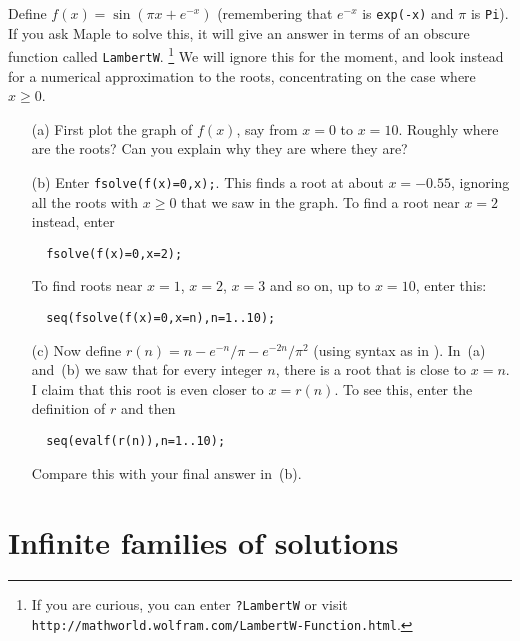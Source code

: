 \documentclass[a4paper,10pt]{amsbook}
\numberwithin{example}{chapter}
\begin{document}
\begin{exercise}\label{ex-adjusted-sin}
 Define $f(x)=\sin(\pi x+e^{-x})$ (remembering that $e^{-x}$ is
 \verb~exp(-x)~ and $\pi$ is \verb~Pi~).  If you ask Maple to solve
 this, it will give an answer in terms of an obscure function called
 \verb~LambertW~.  \footnote{If you are curious, you can enter
   \verb~?LambertW~ or visit
   \verb~http://mathworld.wolfram.com/LambertW-Function.html~.} 
 We will ignore this for the moment, and look instead for a numerical
 approximation to the roots, concentrating on the case where
 $x\geq 0$.
 \begin{itemize}
  \item[(a)] First plot the graph of $f(x)$, say from $x=0$ to $x=10$. 
   Roughly where are the roots?  Can you explain why they are where
   they are? 
  \item[(b)] Enter \verb~fsolve(f(x)=0,x);~.  This finds a root at
   about $x=-0.55$, ignoring all the roots with $x\geq 0$ that we saw
   in the graph.  To find a root near $x=2$ instead, enter
\begin{verbatim}
  fsolve(f(x)=0,x=2);
\end{verbatim}
   To find roots near $x=1$, $x=2$, $x=3$ and so on, up to $x=10$,
   enter this:
\begin{verbatim}
  seq(fsolve(f(x)=0,x=n),n=1..10);
\end{verbatim}
  \item[(c)] Now define $r(n)=n-e^{-n}/\pi-e^{-2n}/\pi^2$
   (using syntax as in \note{\NOTEseriesdef}).  In~(a)
   and~(b) we saw that for every integer $n$, there is a root that is
   close to $x=n$.  I claim that this root is even closer to
   $x=r(n)$.  To see this, enter the definition of $r$ and then 
\begin{verbatim}
  seq(evalf(r(n)),n=1..10);
\end{verbatim}
   Compare this with your final answer in~(b). 
 \end{itemize}
\end{exercise}

\section{Infinite families of solutions}
\end{document}

